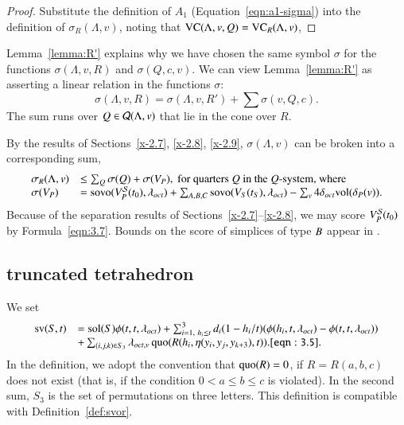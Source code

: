 \begin{proof} Substitute the definition of $A_1$
(Equation~\ref{eqn:a1-sigma}) into the definition of
$\sigma_R(\Lambda,v)$, noting that ${\operatorname{VC}}(\Lambda,v,Q) 
= {\operatorname{VC}}_{R}(\Lambda,v)$,
\end{proof}

\begin{remark}   Lemma~\ref{lemma:R'} explains why we have chosen
the same symbol $\sigma$ for the functions $\sigma(\Lambda,v,R)$ and
$\sigma(Q,c,v)$.  We can view Lemma~\ref{lemma:R'} as asserting a
linear relation in the functions $\sigma$:
   $$\sigma(\Lambda,v,R) = \sigma(\Lambda,v,R') + \sum \sigma(v,Q,c).$$
The sum runs over $Q\in{\mathcal Q}(\Lambda,v)$ that lie in the cone over $R$.
\end{remark}


By the results of Sections~\ref{x-2.7}, \ref{x-2.8}, \ref{x-2.9},
$\sigma(\Lambda,v)$ can be broken into a corresponding sum,
    $$
    \begin{array}{lll}
    \sigma_R(\Lambda,v) &\le \sum_Q \sigma(Q) + \sigma(V_P),
                \hbox{ for quarters $Q$ in the $Q$-system, where}\\
    \sigma(V_P) &= {\operatorname{sovo}}(V^{{\mathcal S}}_P(t_0),\lambda_{oct})+  \sum_{A,B,C} {\operatorname{sovo}}(V_S(t_S),\lambda_{oct})
        - \sum_v 4\delta_{oct}{\operatorname{vol}}(\delta_P(v)).\\
    \end{array}
    $$
Because of the separation
results of Sections~\ref{x-2.7}--\ref{x-2.8},  we may score
$V^{{\mathcal S}}_P(t_0)$ by Formula~\ref{eqn:3.7}. Bounds on the score of
simplices of type $B$ appear in .



\subsection{truncated tetrahedron}


We set
    \begin{equation}
    \begin{array}{lll}
    \op{sv}(S,t) &=
    \sol(S)\phi(t,t,\lambda_{oct})
    +\sum_{i=1,\ h_i\le t}^3 d_i (1-h_i/t) (\phi(h_i,t,\lambda_{oct})-
    \phi(t,t,\lambda_{oct})) \\
    &+\sum_{(i,j,k)\in S_3}
    \lambda_{oct,v}
    \quo(R(h_i,\eta(y_i,y_j,y_{k+3}),t)).
    \tlabel{eqn:3.5}
    \end{array}
    \end{equation}
In the definition, we adopt the convention that $\operatorname{quo}(R)=0$, if
$R=R(a,b,c)$ does not exist (that is, if the condition
    $0< a\le b\le c$
is violated). In the second sum, $S_3$ is the set of permutations
on three letters. This definition is compatible with
Definition~\ref{def:svor}.

